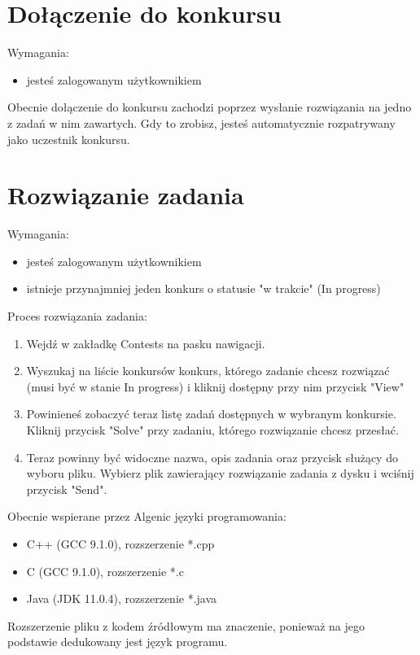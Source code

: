 \documentclass{article}
\begin{document}
\section{Dołączenie do konkursu}
Wymagania:
\begin{itemize}
	\item jesteś zalogowanym użytkownikiem
\end{itemize}
Obecnie dołączenie do konkursu zachodzi poprzez wysłanie rozwiązania na jedno z zadań w nim zawartych. Gdy to zrobisz, jesteś automatycznie rozpatrywany jako uczestnik konkursu.

\section{Rozwiązanie zadania}
Wymagania:
\begin{itemize}
	\item jesteś zalogowanym użytkownikiem
	\item istnieje przynajmniej jeden konkurs o statusie "w trakcie" (In progress)
\end{itemize}
Proces rozwiązania zadania:
\begin{enumerate}
	\item Wejdź w zakładkę Contests na pasku nawigacji.
	\item Wyszukaj na liście konkursów konkurs, którego zadanie chcesz rozwiązać (musi być w stanie In progress) i kliknij dostępny przy nim przycisk "View"
	\item Powinieneś zobaczyć teraz listę zadań dostępnych w wybranym konkursie. Kliknij przycisk "Solve" przy zadaniu, którego rozwiązanie chcesz przesłać.
	\item Teraz powinny być widoczne nazwa, opis zadania oraz przycisk służący do wyboru pliku. Wybierz plik zawierający rozwiązanie zadania z dysku i wciśnij przycisk "Send".
\end{enumerate}
Obecnie wspierane przez Algenic języki programowania:
\begin{itemize}
	\item C++ (GCC 9.1.0), rozszerzenie *.cpp
	\item C (GCC 9.1.0), rozszerzenie *.c
	\item Java (JDK 11.0.4), rozszerzenie *.java
\end{itemize}
Rozszerzenie pliku z kodem źródłowym ma znaczenie, ponieważ na jego podstawie dedukowany jest język programu.
\end{document}
